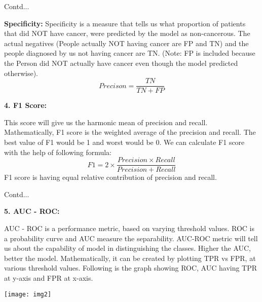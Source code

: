 \documentclass{beamer}
\newcommand\myheading[1]{%
  \par\bigskip
  {\large\bfseries#1}\par\smallskip}
\begin{document}
\begin{frame}{Contd...}
	\begin{flushleft}
	\textbf{Specificity:} Specificity is a measure that tells us what proportion of patients that did NOT have cancer, were predicted by the model as non-cancerous. The actual negatives (People actually NOT having cancer are FP and TN) and the people diagnosed by us not having cancer are TN. (Note: FP is included because the Person did NOT actually have cancer even though the model predicted otherwise).
	\begin{equation*}
		Precison = \frac{TN}{TN + FP}
	\end{equation*}
	\myheading{4. F1 Score:}
	This score will give us the harmonic mean of precision and recall. Mathematically, F1 score is the weighted average of the precision and recall. The best value of F1 would be 1 and worst would be 0. We can calculate F1 score with the help of following formula:
	\begin{equation*}
		F1 = 2 \times \frac{Precision \times Recall}{Precision + Recall}
	\end{equation*}
F1 score is having equal relative contribution of precision and recall.
\end{flushleft}
\end{frame}

\begin{frame}{Contd...}
	\begin{flushleft}
		\myheading{5. AUC - ROC:}
		AUC - ROC is a performance metric, based on varying threshold values. ROC is a probability curve and AUC measure the separability. AUC-ROC metric will tell us about the capability of model in distinguishing the classes. Higher the AUC, better the model. Mathematically, it can be created by plotting TPR vs FPR, at various threshold values. Following is the graph showing ROC, AUC having TPR at y-axis and FPR at x-axis.
	\end{flushleft}
	\texttt{[image: img2]}
\end{frame}
\end{document}
